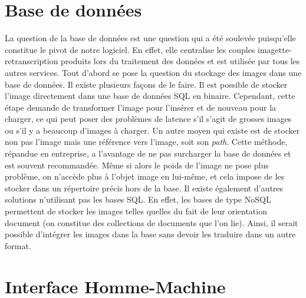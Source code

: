 \section{Base de données}

La question de la base de données est une question qui a été soulevée puisqu'elle constitue le pivot de notre
logiciel. En effet, elle centralise les couples imagette-retranscription produits lors du traitement des données
et est utilisée par tous les autres services. Tout d'abord se pose la question du stockage des images dans
une base de données. Il existe plusieurs façons de le faire. Il est possible de stocker l'image directement dans
une base de données SQL en binaire. Cependant, cette étape demande de transformer l'image pour l'insérer et de nouveau
pour la charger, ce qui peut poser des problèmes de latence s'il s'agit de grosses images ou s'il y a beaucoup
d'images à charger. Un autre moyen qui existe est de stocker non pas l'image mais une référence vers l'image,
soit son \textit{path}. Cette méthode, répandue en entreprise, a l'avantage de ne pas surcharger la base de données et
est souvent recommandée. Même si alors le poids de l'image ne pose plus problème, on n'accède plus à l'objet image en
lui-même, et cela impose de les stocker dans un répertoire précis hors de la base. Il existe également d'autres solutions
n'utilisant pas les bases SQL. En effet, les bases de type NoSQL permettent de stocker les images telles quelles du fait
de leur orientation document (on constitue des collections de documents que l'on lie). Ainsi, il serait possible d'intégrer
les images dans la base sans devoir les traduire dans un autre format.

\section{Interface Homme-Machine}

